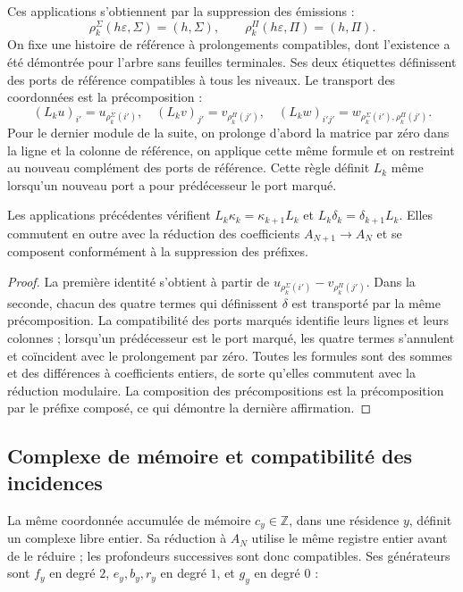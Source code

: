 Ces applications s'obtiennent par la suppression des émissions :
\[
\rho_k^\Sigma(h\varepsilon,\Sigma)=(h,\Sigma),\qquad
\rho_k^\Pi(h\varepsilon,\Pi)=(h,\Pi).
\]
On fixe une histoire de référence à prolongements compatibles, dont l'existence a été démontrée pour l'arbre sans feuilles terminales. Ses deux étiquettes définissent des ports de référence compatibles à tous les niveaux. Le transport des coordonnées est la précomposition :
\[
(L_ku)_{i'}=u_{\rho_k^\Sigma(i')},\quad
(L_kv)_{j'}=v_{\rho_k^\Pi(j')},\quad
(L_kw)_{i'j'}=w_{\rho_k^\Sigma(i'),\rho_k^\Pi(j')}.
\]
Pour le dernier module de la suite, on prolonge d’abord la matrice par zéro dans la ligne et la colonne de référence, on applique cette même formule et on restreint au nouveau complément des ports de référence. Cette règle définit \(L_k\) même lorsqu’un nouveau port a pour prédécesseur le port marqué.

\begin{proposition}
\label{iv:rectangular-natural}
Les applications précédentes vérifient
\(L_k\kappa_k=\kappa_{k+1}L_k\) et
\(L_k\delta_k=\delta_{k+1}L_k\).
Elles commutent en outre avec la réduction des coefficients
\(A_{N+1}\to A_N\) et se composent conformément à la suppression des préfixes.
\end{proposition}
\begin{proof}
La première identité s’obtient à partir de
\(u_{\rho_k^\Sigma(i')}-v_{\rho_k^\Pi(j')}\).
Dans la seconde, chacun des quatre termes qui définissent \(\delta\)
est transporté par la même précomposition. La compatibilité des
ports marqués identifie leurs lignes et leurs colonnes ; lorsqu’un prédécesseur est
le port marqué, les quatre termes s’annulent et coïncident avec
le prolongement par zéro. Toutes les formules sont des sommes et des différences à
coefficients entiers, de sorte qu’elles commutent avec la réduction modulaire.
La composition des précompositions est la précomposition par le
préfixe composé, ce qui démontre la dernière affirmation.
\end{proof}

\subsection{Complexe de mémoire et compatibilité des incidences}
\label{iv:cont:memoria}
La même coordonnée accumulée de mémoire \(c_y\in\mathbb Z\), dans une résidence \(y\), définit un complexe libre entier. Sa réduction à \(A_N\) utilise le même registre entier avant de le réduire ; les profondeurs successives sont donc compatibles. Ses générateurs sont \(f_y\) en degré \(2\), \(e_y,b_y,r_y\) en degré \(1\), et \(g_y\) en degré \(0\) :

